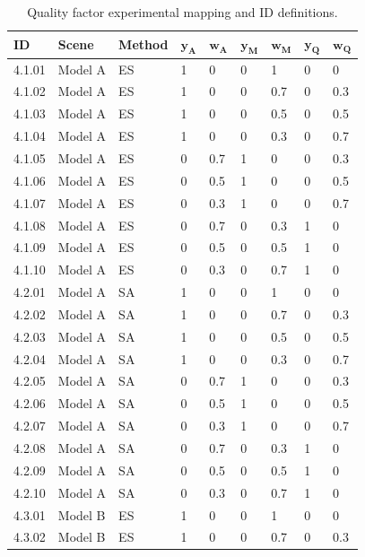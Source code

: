 \begin{table}[!t]
\centering
\footnotesize
\caption{Quality factor experimental mapping and ID definitions.}
\label{tab:quality_params}
\begin{tabular}{@{}lllllllll@{}}
\hline
    \textbf{ID} & \textbf{Scene} & \textbf{Method} & $\bm{y_{\text{A}}}$ & $\bm{w_{\text{A}}}$ & $\bm{y_{\text{M}}}$ & $\bm{w_{\text{M}}}$ & $\bm{y_{\text{Q}}}$ & $\bm{w_{\text{Q}}}$ \\
\hline
    4.1.01 & Model A & ES & 1 & 0 & 0 & 1 & 0 & 0 \\
    4.1.02 & Model A & ES & 1 & 0 & 0 & 0.7 & 0 & 0.3 \\
    4.1.03 & Model A & ES & 1 & 0 & 0 & 0.5 & 0 & 0.5 \\
    4.1.04 & Model A & ES & 1 & 0 & 0 & 0.3 & 0 & 0.7 \\
    4.1.05 & Model A & ES & 0 & 0.7 & 1 & 0 & 0 & 0.3 \\
    4.1.06 & Model A & ES & 0 & 0.5 & 1 & 0 & 0 & 0.5 \\
    4.1.07 & Model A & ES & 0 & 0.3 & 1 & 0 & 0 & 0.7 \\
    4.1.08 & Model A & ES & 0 & 0.7 & 0 & 0.3 & 1 & 0 \\
    4.1.09 & Model A & ES & 0 & 0.5 & 0 & 0.5 & 1 & 0 \\
    4.1.10 & Model A & ES & 0 & 0.3 & 0 & 0.7 & 1 & 0 \\
    \noalign{\smallskip}
    4.2.01 & Model A & SA & 1 & 0 & 0 & 1 & 0 & 0 \\
    4.2.02 & Model A & SA & 1 & 0 & 0 & 0.7 & 0 & 0.3 \\
    4.2.03 & Model A & SA & 1 & 0 & 0 & 0.5 & 0 & 0.5 \\
    4.2.04 & Model A & SA & 1 & 0 & 0 & 0.3 & 0 & 0.7 \\
    4.2.05 & Model A & SA & 0 & 0.7 & 1 & 0 & 0 & 0.3 \\
    4.2.06 & Model A & SA & 0 & 0.5 & 1 & 0 & 0 & 0.5 \\
    4.2.07 & Model A & SA & 0 & 0.3 & 1 & 0 & 0 & 0.7 \\
    4.2.08 & Model A & SA & 0 & 0.7 & 0 & 0.3 & 1 & 0 \\
    4.2.09 & Model A & SA & 0 & 0.5 & 0 & 0.5 & 1 & 0 \\
    4.2.10 & Model A & SA & 0 & 0.3 & 0 & 0.7 & 1 & 0 \\
    \noalign{\smallskip}
    4.3.01 & Model B & ES & 1 & 0 & 0 & 1 & 0 & 0 \\
    4.3.02 & Model B & ES & 1 & 0 & 0 & 0.7 & 0 & 0.3 \\

\end{tabular}
\end{table}
